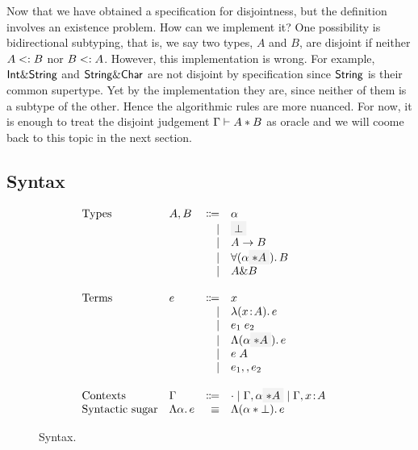 Now that we have obtained a specification for disjointness, but the definition
involves an existence problem. How can we implement it? One possibility is
bidirectional subtyping, that is, we say two types, $A$ and $B$, are disjoint if
neither $A <: B$ nor $B <: A$. However, this implementation is
wrong. For example, $\textsf{Int} \& \textsf{String}$ and $\textsf{String} \& \textsf{Char}$ are
not disjoint by specification since $\textsf{String}$ is their common supertype. Yet
by the implementation they are, since neither of them is a subtype of
the other. 
Hence the algorithmic rules are more nuanced. For now, it is enough to treat the
disjoint judgement $\Gamma \vdash A * B$ as oracle and we will coome back to
this topic in the next section.


\subsection{Syntax}

\begin{figure}[h]
  \[
    \begin{array}{l}
      \begin{array}{llrll}
        \text{Types}
        & A, B & \Coloneqq & \alpha                  & \\
        &      & \mid & \highlight {$\bot$}          & \\
        &      & \mid & A \to B                      & \\
        &      & \mid & \for {(\alpha \highlight {$\disjoint A$})} B  & \\
        &      & \mid & A \inter B                   & \\

        \\
        \text{Terms}
        & e & \Coloneqq & x                        & \\
        &   & \mid & \lam {(x \hast A)} e          & \\
        &   & \mid & \app {e_1} {e_2}              & \\
        &   & \mid & \blam {(\alpha \highlight {$\disjoint A$})} e  & \\
        &   & \mid & \tapp e A                     & \\
        &   & \mid & e_1 \mergeop e_2              & \\

        \\
        \text{Contexts}
        & \Gamma & \Coloneqq & \cdot
                   \mid \Gamma, \alpha \highlight {$\disjoint A$}
                   \mid \Gamma, x \hast A  & \\

        \text{Syntactic sugar} & \blam {\alpha} e & \equiv & \blam {(\alpha \disjoint \bot)} e & \\
      \end{array}
    \end{array}
  \]

  \label{fig:syntax} \caption{Syntax.}
\end{figure}

